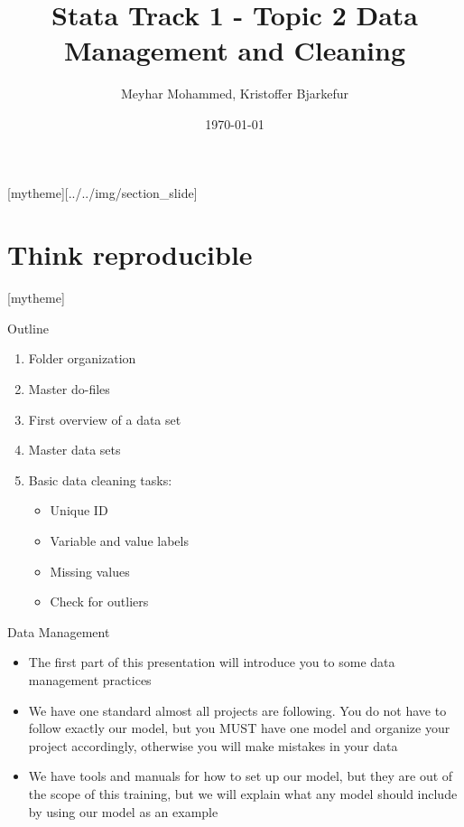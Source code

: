 \documentclass[aspectratio=169]{beamer}
\title{Stata Track 1 - Topic 2 \newline Data Management and Cleaning}
\date{\today}
\author{Meyhar Mohammed, Kristoffer Bjarkefur} %
\institute{Development Impact Evaluation (DIME) \newline The World Bank }
\newcommand{\sectionpic}[2]{
	\setbeamertemplate{section page}[mytheme][#2]
	\section{#1}
	\setbeamertemplate{section page}[mytheme]
}
\begin{document}
{
	\maketitle
}

\sectionpic{Think reproducible}{../../img/section_slide}


\begin{frame}{Outline}
	\begin{enumerate}
		\item Folder organization
		\item Master do-files
		\item First overview of a data set
		\item Master data sets
		\item Basic data cleaning tasks:
			\begin{itemize}
				\item Unique ID
				\item Variable and value labels
				\item Missing values
				\item Check for outliers
			\end{itemize}
	\end{enumerate}
\end{frame}


\begin{frame}{Data Management}
	\begin{itemize}
		\item The first part of this presentation will introduce you to some data management practices
		\item We have one standard almost all projects are following. You do not have to follow exactly our model, but you MUST have one model and organize your project accordingly, otherwise you will make mistakes in your data
		\item We have tools and manuals for how to set up our model, but they are out of the scope of this training, but we will explain what any model should include by using our model as an example
	\end{itemize}
\end{frame}
\end{document}
